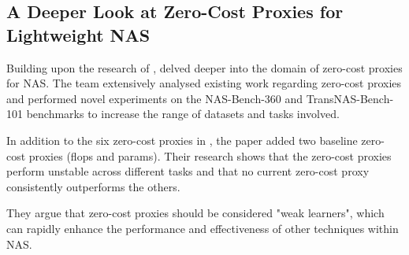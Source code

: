 \subsection{A Deeper Look at Zero-Cost Proxies for Lightweight NAS}

Building upon the research of \cite{abdelfattah2021zero}, \cite{colin2022adeeperlook} delved deeper into the domain of zero-cost proxies for \gls{NAS}. The team extensively analysed existing work regarding zero-cost proxies and performed novel experiments on the NAS-Bench-360 \autocite{tu2021bench} and TransNAS-Bench-101 \autocite{duan2021transnas} benchmarks to increase the range of datasets and tasks involved.

In addition to the six zero-cost proxies in \cite{abdelfattah2021zero}, the paper added two baseline zero-cost proxies (\gls{flops} and params). Their research shows that the zero-cost proxies perform unstable across different tasks and that no current zero-cost proxy consistently outperforms the others. 

They argue that zero-cost proxies should be considered "weak learners", which can rapidly enhance the performance and effectiveness of other techniques within \gls{NAS}. 

